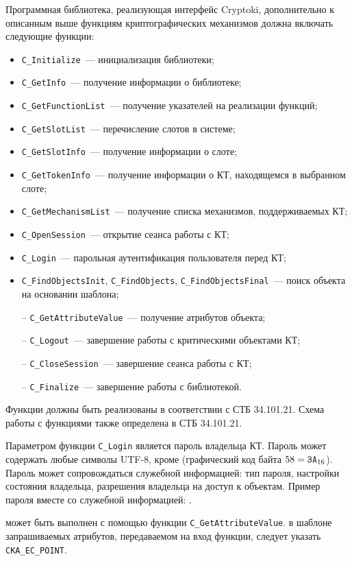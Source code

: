 Программная библиотека, реализующая интерфейс Cryptoki,
дополнительно к описанным выше функциям криптографических механизмов 
должна включать следующие функции:
\begin{itemize}
\item
\verb|C_Initialize|~--- инициализация библиотеки;
\item
\verb|C_GetInfo|~--- получение информации о библиотеке;
\item
\verb|C_GetFunctionList|~--- получение указателей на реализации функций;
\item
\verb|C_GetSlotList|~--- перечисление слотов в системе;
\item
\verb|C_GetSlotInfo|~--- получение информации о слоте;
\item
\verb|C_GetTokenInfo|~--- получение информации о КТ, находящемся в 
выбранном слоте;
\item
\verb|C_GetMechanismList|~--- 
получение списка механизмов, поддерживаемых КТ;
\item
\verb|C_OpenSession|~--- открытие сеанса работы с КТ;
\item
\verb|C_Login|~--- парольная аутентификация пользователя перед КТ;
\item
\verb|C_FindObjectsInit|, \verb|C_FindObjects|, 
\verb|C_FindObjectsFinal|~---
поиск объекта на основании шаблона;
\item[--]
\verb|C_GetAttributeValue|~--- получение атрибутов объекта;
\item[--]
\verb|C_Logout|~--- завершение работы с критическими объектами КТ;
\item[--]
\verb|C_CloseSession|~--- завершение сеанса работы с КТ;
\item[--]
\verb|C_Finalize|~--- завершение работы с библиотекой.
\end{itemize}

Функции должны быть реализованы в соответствии с СТБ 34.101.21.
Схема работы с функциями также определена в СТБ 34.101.21.

Параметром функции \verb|C_Login| является пароль владельца КТ.
Пароль может содержать любые символы UTF-8, кроме \str{:} 
(графический код байта $58=\texttt{3A}_{16}$). Пароль может сопровождаться 
служебной информацией: тип пароля, настройки состояния владельца,
разрешения владельца на доступ к объектам. 
%
Пример пароля вместе со служебной информацией: . 

 может быть выполнен
с помощью функции \verb|C_GetAttributeValue|. в шаблоне запрашиваемых 
атрибутов, передаваемом на вход функции, следует указать \verb|CKA_EC_POINT|.

